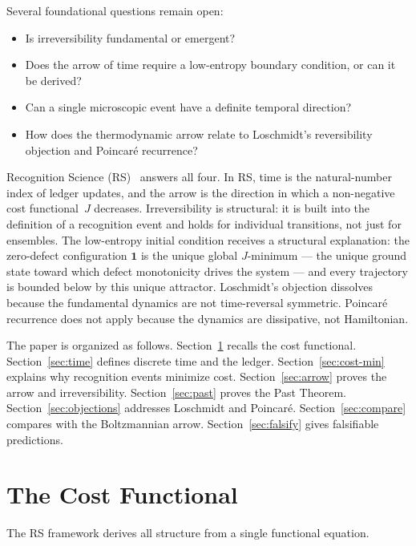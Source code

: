 \documentclass[12pt,a4paper]{article}
\theoremstyle{definition}
\theoremstyle{remark}
\begin{document}
Several foundational questions remain open:
\begin{itemize}[nosep]
  \item Is irreversibility fundamental or emergent?
  \item Does the arrow of time require a low-entropy boundary condition,
    or can it be derived?
  \item Can a single microscopic event have a definite temporal
    direction?
  \item How does the thermodynamic arrow relate to Loschmidt's
    reversibility objection and Poincar\'e recurrence?
\end{itemize}

Recognition Science (RS)~\cite{RS_Axioms} answers all four.  In RS,
time is the natural-number index of ledger updates, and the arrow is
the direction in which a non-negative cost functional~$J$ decreases.
Irreversibility is structural: it is built into the definition of a
recognition event and holds for individual transitions, not just for
ensembles.  The low-entropy initial condition receives a structural
explanation: the zero-defect configuration $\mathbf{1}$ is the unique
global $J$-minimum --- the unique ground state toward which defect
monotonicity drives the system --- and every trajectory is bounded
below by this unique attractor.  Loschmidt's objection dissolves because
the fundamental dynamics are not time-reversal symmetric.  Poincar\'e
recurrence does not apply because the dynamics are dissipative, not
Hamiltonian.

The paper is organized as follows.  Section~\ref{sec:cost} recalls the
cost functional.  Section~\ref{sec:time} defines discrete time and the
ledger.  Section~\ref{sec:cost-min} explains why recognition events
minimize cost.  Section~\ref{sec:arrow} proves the arrow and
irreversibility.  Section~\ref{sec:past} proves the Past Theorem.
Section~\ref{sec:objections} addresses Loschmidt and Poincar\'e.
Section~\ref{sec:compare} compares with the Boltzmannian arrow.
Section~\ref{sec:falsify} gives falsifiable predictions.

\section{The Cost Functional}
\label{sec:cost}

The RS framework derives all structure from a single functional
equation.
\end{document}

